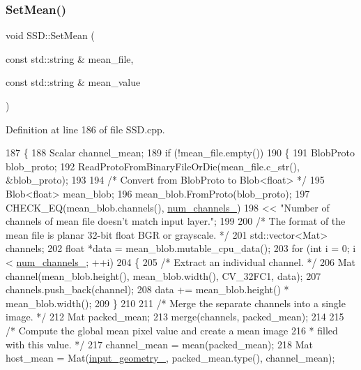 \subsubsection{\texorpdfstring{Set\+Mean()}{SetMean()}}
{\footnotesize\ttfamily void S\+S\+D\+::\+Set\+Mean (\begin{DoxyParamCaption}\item[{const std\+::string \&}]{mean\+\_\+file,  }\item[{const std\+::string \&}]{mean\+\_\+value }\end{DoxyParamCaption})\hspace{0.3cm}{\ttfamily [private]}}



Definition at line 186 of file S\+S\+D.\+cpp.


\begin{DoxyCode}
187 \{
188     Scalar channel\_mean;
189     \textcolor{keywordflow}{if} (!mean\_file.empty())
190     \{
191         BlobProto blob\_proto;
192         ReadProtoFromBinaryFileOrDie(mean\_file.c\_str(), &blob\_proto);
193 
194         \textcolor{comment}{/* Convert from BlobProto to Blob<float> */}
195         Blob<float> mean\_blob;
196         mean\_blob.FromProto(blob\_proto);
197         CHECK\_EQ(mean\_blob.channels(), \mbox{\hyperlink{class_s_s_d_affe6f7e948b0040bd958db34758d8ab1}{num\_channels\_}})
198             << \textcolor{stringliteral}{"Number of channels of mean file doesn't match input layer."};
199 
200         \textcolor{comment}{/* The format of the mean file is planar 32-bit float BGR or grayscale. */}
201         std::vector<Mat> channels;
202         \textcolor{keywordtype}{float} *data = mean\_blob.mutable\_cpu\_data();
203         \textcolor{keywordflow}{for} (\textcolor{keywordtype}{int} i = 0; i < \mbox{\hyperlink{class_s_s_d_affe6f7e948b0040bd958db34758d8ab1}{num\_channels\_}}; ++i)
204         \{
205             \textcolor{comment}{/* Extract an individual channel. */}
206             Mat channel(mean\_blob.height(), mean\_blob.width(), CV\_32FC1, data);
207             channels.push\_back(channel);
208             data += mean\_blob.height() * mean\_blob.width();
209         \}
210 
211         \textcolor{comment}{/* Merge the separate channels into a single image. */}
212         Mat packed\_mean;
213         merge(channels, packed\_mean);
214 
215         \textcolor{comment}{/* Compute the global mean pixel value and create a mean image}
216 \textcolor{comment}{     * filled with this value. */}
217         channel\_mean = mean(packed\_mean);
218         Mat host\_mean = Mat(\mbox{\hyperlink{class_s_s_d_a3fe828551a5a53a3f43a481ae5d2d96a}{input\_geometry\_}}, packed\_mean.type(), channel\_mean);

\end{DoxyCode}
